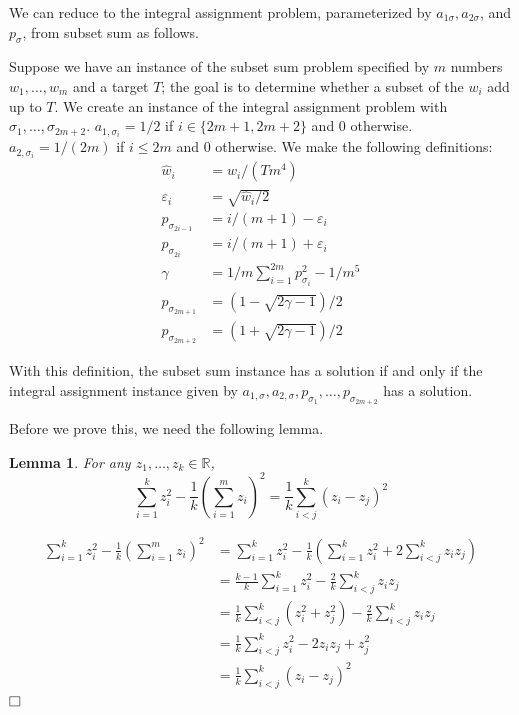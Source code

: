 \documentclass[11pt]{article}
\def\R{\mathbb{R}}
\def\squarebox#1{\hbox to #1{\hfill\vbox to #1{\vfill}}}
\newcommand{\qed}{\hspace*{\fill}\vbox{\hrule\hbox{\vrule\squarebox{.667em}\vrule}\hrule}\smallskip}
\newenvironment{proof}{\noindent{\bf Proof:~~}}{\(\qed\)}
\newtheorem{lemma}[theorem]{Lemma}
\newcommand{\p}[1]{\left(#1\right)}
\begin{document}
We can reduce to the integral assignment problem, parameterized by $a_{1\sigma},
a_{2\sigma}$, and $p_{\sigma}$, from subset sum as follows.

Suppose we have an instance of the subset sum problem specified by 
$m$ numbers $w_1, \dots, w_m$ and a target $T$; the goal is to
determine whether a subset of the $w_i$ add up to $T$.
We create an instance of
the integral assignment problem with $\sigma_1, \dots, \sigma_{2m+2}$.
$a_{1,\sigma_i} = 1/2$ if $i \in \{2m+1, 2m+2\}$ and 0 otherwise.
$a_{2,\sigma_i} = 1/(2m)$ if $i \le 2m$ and 0 otherwise. We make the following
definitions:
\begin{align*}
  \hat w_i &= w_i/(T m^4) \\
  \varepsilon_i &= \sqrt{\hat w_i / 2} \\
  p_{\sigma_{2i-1}} &= i/(m+1) - \varepsilon_i \tag{$1 \le i \le m$} \\
  p_{\sigma_{2i}} &= i/(m+1) + \varepsilon_i \tag{$1 \le i \le m$} \\
  \gamma &= 1/m \sum_{i=1}^{2m} p_{\sigma_i}^2 - 1/m^5 \\
  p_{\sigma_{2m+1}} &= (1 - \sqrt{2\gamma-1})/2 \\
  p_{\sigma_{2m+2}} &= (1 + \sqrt{2\gamma-1})/2
\end{align*}

With this definition, the subset sum instance has a solution if and only if the
integral assignment instance given by $a_{1,\sigma}, a_{2,\sigma}, p_{\sigma_1},
\dots, p_{\sigma_{2m+2}}$ has a solution.

Before we prove this, we need the following lemma.

\begin{lemma}
  For any $z_1, \dots, z_k \in \R$,
  \[
    \sum_{i=1}^k z_i^2 - \frac{1}{k} \p{\sum_{i=1}^m z_i}^2 =
    \frac{1}{k} \sum_{i < j}^k (z_i - z_j)^2
  \]
  \label{lem:square_diff}
\end{lemma}
\begin{proof}
  \begin{align*}
    \sum_{i=1}^k z_i^2 - \frac{1}{k} \p{\sum_{i=1}^m z_i}^2 &= \sum_{i=1}^k
    z_i^2 - \frac{1}{k} \p{\sum_{i=1}^k z_i^2 + 2 \sum_{i < j}^k z_i z_j} \\
    &= \frac{k-1}{k} \sum_{i=1}^k z_i^2 - \frac{2}{k} \sum_{i < j}^k z_i z_j \\
    &= \frac{1}{k} \sum_{i < j}^k (z_i^2 + z_j^2) - \frac{2}{k} \sum_{i < j}^k
    z_i z_j \\
    &= \frac{1}{k} \sum_{i < j}^k z_i^2 - 2 z_i z_j + z_j^2 \\
    &= \frac{1}{k} \sum_{i < j}^k (z_i - z_j)^2
  \end{align*}
\end{proof}
\end{document}
